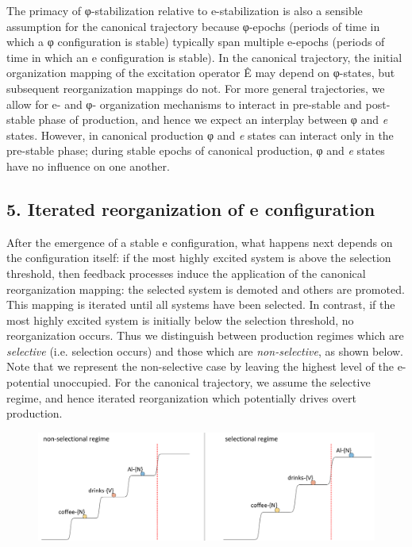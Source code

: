   The primacy of φ-stabilization relative to e-stabilization is also a sensible assumption for the canonical trajectory because φ-epochs (periods of time in which a φ configuration is stable) typically span multiple e-epochs (periods of time in which an e configuration is stable). In the canonical trajectory, the initial organization mapping of the excitation operator Ê may depend on φ-states, but subsequent reorganization mappings do not. For more general trajectories, we allow for e- and φ- organization mechanisms to interact in pre-stable and post-stable phase of production, and hence we expect an interplay between φ and \textit{e} states. However, in canonical production φ and \textit{e} states can interact only in the pre-stable phase; during stable epochs of canonical production, φ and \textit{e} states have no influence on one another. 

\subsection{5. Iterated reorganization of e configuration}

After the emergence of a stable e configuration, what happens next depends on the configuration itself: if the most highly excited system is above the selection threshold, then feedback processes induce the application of the canonical reorganization mapping: the selected system is demoted and others are promoted. This mapping is iterated until all systems have been selected. In contrast, if the most highly excited system is initially below the selection threshold, no reorganization occurs. Thus we distinguish between production regimes which are \textit{selective} (i.e. selection occurs) and those which are \textit{non-selective}, as shown below. Note that we represent the non-selective case by leaving the highest level of the e-potential unoccupied. For the canonical trajectory, we assume the selective regime, and hence iterated reorganization which potentially drives overt production. 

  
\begin{figure}
\includegraphics[width=\textwidth]{figures/Tilsen-img53.png}
\caption{\missingcaption}
\label{fig:4:3}
\end{figure}
 

